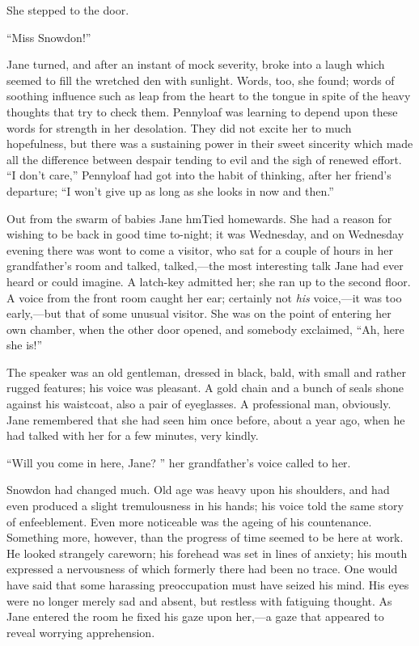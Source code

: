 She stepped to the door.

``Miss Snowdon!''

Jane turned, and after an instant of mock severity, broke into a laugh
which seemed to fill the wretched den with sunlight. Words, too, she
found; words of soothing influence such as leap from the heart to the
tongue in spite of the heavy thoughts that try to check them. Pennyloaf
was learning to depend upon these words for strength in her desolation.
They did not excite her to much hopefulness, but there was a sustaining
power in their sweet sincerity which made all the difference between
despair tending to evil and the sigh of renewed effort. ``I don't
care,'' Pennyloaf had got into the habit of thinking, {}after her
friend's departure; ``I won't give up as long as she looks in now and
then.''

Out from the swarm of babies Jane hmTied homewards. She had a reason for
wishing to be back in good time to-night; it was Wednesday, and on
Wednesday evening there was wont to come a visitor, who sat for a couple
of hours in her grandfather's room and talked, talked,---the most
interesting talk Jane had ever heard or could imagine. A latch-key
admitted her; she ran up to the second floor. A voice from the front
room caught her ear; certainly not \emph{his} voice,---it was too
early,---but that of some unusual visitor. She was on the point of
entering her own chamber, when the other door opened, and somebody
exclaimed, ``Ah, here she is!''

The speaker was an old gentleman, dressed in black, bald, with small and
rather rugged features; his voice was pleasant. A gold chain and a bunch
of seals shone against his waistcoat, also a pair of eyeglasses. A
professional man, obviously. Jane remembered {}that she had seen him
once before, about a year ago, when he had talked with her for a few
minutes, very kindly.

``Will you come in here, Jane? '' her grandfather's voice called to her.

Snowdon had changed much. Old age was heavy upon his shoulders, and had
even produced a slight tremulousness in his hands; his voice told the
same story of enfeeblement. Even more noticeable was the ageing of his
countenance. Something more, however, than the progress of time seemed
to be here at work. He looked strangely careworn; his forehead was set
in lines of anxiety; his mouth expressed a nervousness of which formerly
there had been no trace. One would have said that some harassing
preoccupation must have seized his mind. His eyes were no longer merely
sad and absent, but restless with fatiguing thought. As Jane entered the
room he fixed his gaze upon her,---a gaze that appeared to reveal
worrying apprehension.

